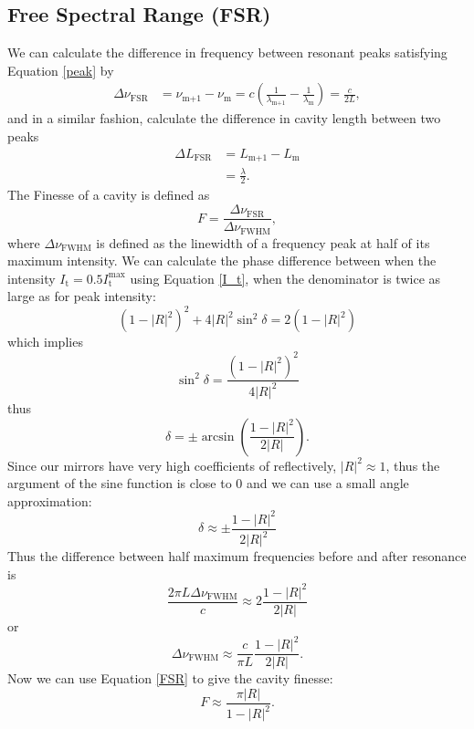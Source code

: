 \documentclass[twocolumn,amsmath,amssymb,pra]{revtex4-2}
\newcommand{\eq}[1]{\begin{equation}#1\end{equation}}
\newcommand{\sub}[1]{_\textrm{#1}}
\begin{document}
\subsection{Free Spectral Range (FSR)}

We can calculate the difference in frequency between resonant peaks satisfying Equation \ref{peak} by
\begin{align} \label{FSR}
    \Delta{}\nu\sub{FSR} &= \nu{}\sub{m+1} - \nu\sub{m}
    = c\left(\frac{1}{\lambda\sub{m+1}} - \frac{1}{\lambda\sub{m}}\right)
    = \frac{c}{2L},
\end{align}
and in a similar fashion, calculate the difference in cavity length between two peaks
\begin{align}
    \Delta{}L\sub{FSR} &= L\sub{m+1} - L\sub{m}\\
    &= \frac{\lambda}{2}.
\end{align}
The Finesse of a cavity is defined as 
\eq{
    F = \frac{\Delta{}\nu\sub{FSR}}{\Delta{}\nu\sub{FWHM}},
}
where $\Delta{}\nu\sub{FWHM}$ is defined as the linewidth of a frequency peak at half of its maximum intensity.
We can calculate the phase difference between when the intensity $I\sub{t} = 0.5 I\sub{t}^\textrm{max}$ using  Equation \ref{I_t}, when the denominator is twice as large as for peak intensity:
\eq{ 
    (1 - |R|^2)^2 + 4|R|^2\sin^2{\delta{}} = 2(1-|R|^2)
}
which implies
\eq{ 
    \sin^2{\delta{}} = \frac{(1 - |R|^2)^2}{4|R|^2}
}
thus
\eq{
    \delta{} = \pm \arcsin\left({\frac{1-|R|^2}{2|R|}}\right).
}
Since our mirrors have very high coefficients of reflectively,  $|R|^2 \approx 1$, thus the argument of the sine function is close to 0 and we can use a small angle approximation:
\eq{
   \delta{} \approx \pm \frac{1-|R|^2}{2|R|^2}
}
Thus the difference between half maximum frequencies before and after resonance is
\eq{
    \frac{2\pi{}L\Delta{}\nu\sub{FWHM}}{c} \approx 2\frac{1-|R|^2}{2|R|}
}
or 
\eq{ \Delta{}\nu\sub{FWHM} \approx \frac{c}{\pi{}L}\frac{1-|R|^2}{2|R|}.
}
Now we can use Equation \ref{FSR} to give the cavity finesse:
\eq{ 
    F \approx \frac{\pi{}|R|}{1-|R|^2}.
}
\end{document}
